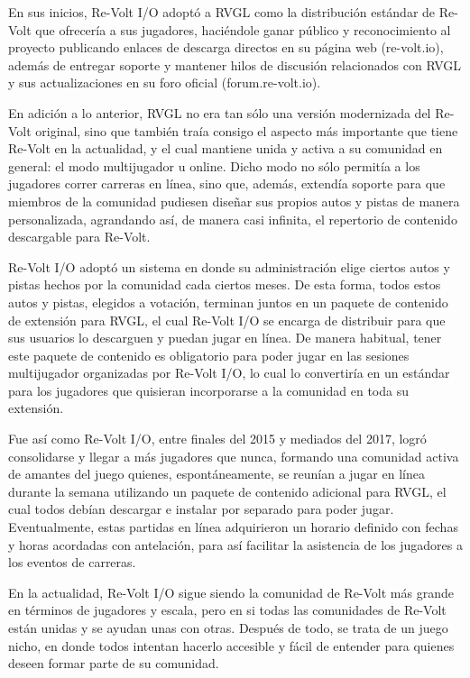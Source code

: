 En sus inicios, Re-Volt I/O adoptó a RVGL como la distribución estándar de Re-Volt que ofrecería a sus jugadores, haciéndole ganar público y reconocimiento al proyecto publicando enlaces de descarga directos en su página web (re-volt.io), además de entregar soporte y mantener hilos de discusión relacionados con RVGL y sus actualizaciones en su foro oficial (forum.re-volt.io).

En adición a lo anterior, RVGL no era tan sólo una versión modernizada del Re-Volt original, sino que también traía consigo el aspecto más importante que tiene Re-Volt en la actualidad, y el cual mantiene unida y activa a su comunidad en general: el modo multijugador u online. Dicho modo no sólo permitía a los jugadores correr carreras en línea, sino que, además, extendía soporte para que miembros de la comunidad pudiesen diseñar sus propios autos y pistas de manera personalizada, agrandando así, de manera casi infinita, el repertorio de contenido descargable para Re-Volt.

Re-Volt I/O adoptó un sistema en donde su administración elige ciertos autos y pistas hechos por la comunidad cada ciertos meses. De esta forma, todos estos autos y pistas, elegidos a votación, terminan juntos en un paquete de contenido de extensión para RVGL, el cual Re-Volt I/O se encarga de distribuir para que sus usuarios lo descarguen y puedan jugar en línea. De manera habitual, tener este paquete de contenido es obligatorio para poder jugar en las sesiones multijugador organizadas por Re-Volt I/O, lo cual lo convertiría en un estándar para los jugadores que quisieran incorporarse a la comunidad en toda su extensión.

Fue así como Re-Volt I/O, entre finales del 2015 y mediados del 2017, logró consolidarse y llegar a más jugadores que nunca, formando una comunidad activa de amantes del juego quienes, espontáneamente, se reunían a jugar en línea durante la semana utilizando un paquete de contenido adicional para RVGL, el cual todos debían descargar e instalar por separado para poder jugar. Eventualmente, estas partidas en línea adquirieron un horario definido con fechas y horas acordadas con antelación, para así facilitar la asistencia de los jugadores a los eventos de carreras.

En la actualidad, Re-Volt I/O sigue siendo la comunidad de Re-Volt más grande en términos de jugadores y escala, pero en si todas las comunidades de Re-Volt están unidas y se ayudan unas con otras. Después de todo, se trata de un juego nicho, en donde todos intentan hacerlo accesible y fácil de entender para quienes deseen formar parte de su comunidad.

